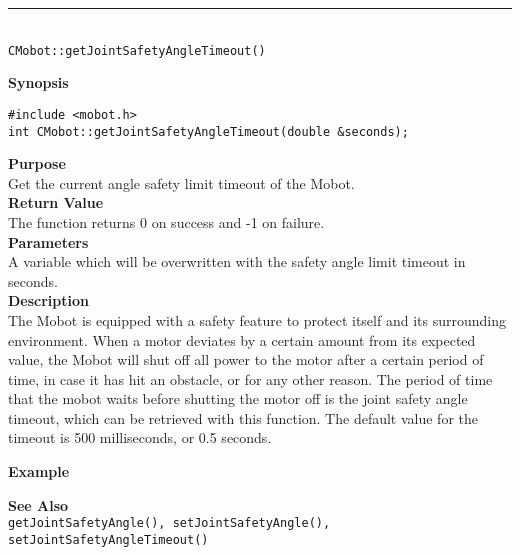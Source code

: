 \noindent
\vspace{5pt}
\rule{4.5in}{0.015in}\\
\noindent
{\LARGE \texttt{CMobot::getJointSafetyAngleTimeout()}}\\
{}

\noindent
{\bf Synopsis}
\vspace{-8pt}
\begin{verbatim}
#include <mobot.h>
int CMobot::getJointSafetyAngleTimeout(double &seconds);
\end{verbatim}

\noindent
{\bf Purpose}\\
Get the current angle safety limit timeout of the Mobot.\\

\noindent
{\bf Return Value}\\
The function returns 0 on success and -1 on failure.\\

\noindent
{\bf Parameters}\\
A variable which will be overwritten with the safety angle limit timeout in seconds.\\

\noindent
{\bf Description}\\
The Mobot is equipped with a safety feature to protect itself and its surrounding
environment. When a motor deviates by a certain amount from its expected value, 
the Mobot will shut off all power to the motor after a certain period of time,
in case it has hit an obstacle, or for any other reason. The period of time that the
mobot waits before shutting the motor off is the joint safety angle timeout, which
can be retrieved with this function. The default value for the timeout is 500 milliseconds,
or 0.5 seconds.
 
\noindent
{\bf Example}\\
\noindent

\noindent
{\bf See Also}\\
\texttt{getJointSafetyAngle(), setJointSafetyAngle(), setJointSafetyAngleTimeout()}\\


